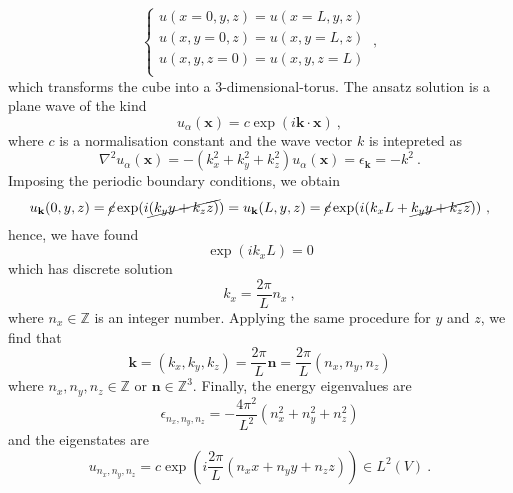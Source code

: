    \begin{equation*}
        \begin{cases}
            u(x=0, y, z) = u(x = L, y, z) \\
            u(x, y=0, z) = u(x, y=L, z) \\
            u(x, y, z=0) = u(x, y, z=L) \\
        \end{cases} ~,
    \end{equation*}
    which transforms the cube into a $3$-dimensional-torus.
    The ansatz solution is a plane wave of the kind
    \begin{equation*}
        u_\alpha (\mathbf x) = c \exp(i \mathbf k \cdot \mathbf x) ~,
    \end{equation*}
    where $c$ is a normalisation constant and the wave vector $k$ is intepreted as
    \begin{equation*}
        \nabla^2 u_\alpha (\mathbf x) = - (k_x^2 + k_y^2 + k_z^2) u_\alpha (\mathbf x) = \epsilon_{\mathbf k} = - k^2 ~.
    \end{equation*}
    Imposing the periodic boundary conditions, we obtain 
    \begin{equation*}
        u_{\mathbf k} (0,y,z) = \cancel{c} \exp(i \cancel{(k_y y + k_z z)}) = u_{\mathbf k} (L,y,z) = \cancel{c} \exp(i (k_x L + \cancel{k_y y + k_z z})) ~,
    \end{equation*}
    hence, we have found
    \begin{equation*}
        \exp(i k_x L) = 0 
    \end{equation*}
    which has discrete solution 
    \begin{equation*}
        k_x = \frac{2 \pi}{L} n_x ~,
    \end{equation*}
    where $n_x \in \mathbb Z$ is an integer number. Applying the same procedure for $y$ and $z$, we find that
    \begin{equation*}
        \mathbf k = (k_x, k_y, k_z) = \frac{2\pi}{L} \mathbf n = \frac{2\pi}{L} (n_x, n_y, n_z) 
    \end{equation*}
    where $n_x, n_y, n_z \in \mathbb Z$ or $\mathbf n \in \mathbb Z^3$. Finally, the energy eigenvalues are 
    \begin{equation*}
        \epsilon_{n_x, n_y, n_z} = - \frac{4\pi^2}{L^2} (n_x^2 + n_y^2 + n_z^2) 
    \end{equation*}
    and the eigenstates are 
    \begin{equation*}
        u_{n_x, n_y, n_z} = c \exp(i \frac{2\pi}{L} (n_x x + n_y y + n_z z)) \in L^2(V) ~.
    \end{equation*}
